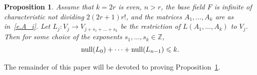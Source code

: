 \documentclass{amsproc}
\newtheorem{proposition}[theorem]{Proposition}
\theoremstyle{definition}
\newtheorem{question}[theorem]{Question}
\theoremstyle{remark}
\numberwithin{equation}{section}
\newcommand{\bbZ}{{\mathbb Z}}
\newcommand{\M}{{\rm Mat}}
\newcommand{\nullity}{{\rm null}}
\begin{document}
\begin{proposition}
\label{prop.red2}
Assume that $k = 2r$ is even, $n > r$, the base field $F$ is infinite of characteristic not dividing $2(2r+1)r!$, and
the matrices $A_1, \ldots, A_k$ are as in~\eqref{e.A_i}. Let $L_j \colon V_j \to V_{j + s_1 + \ldots + s_k}$ 
be the restriction of $L(A_1, \ldots, A_k)$ to $V_j$. Then for some choice of the exponents $s_1, \ldots, s_k \in \bbZ$, 
\[ \nullity(L_0)+\dots+\nullity(L_{n-1})\leqslant k. \]
\end{proposition}

The remainder of this paper will be devoted to proving Proposition~\ref{prop.red2}.
%
% 
% 
\end{document}
